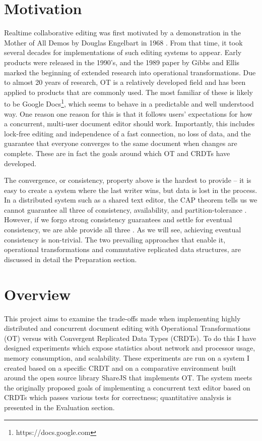\documentclass[12pt,a4paper,twoside,openright]{report}
\begin{document}
\section{Motivation}

Realtime collaborative editing was first motivated by a demonstration in the Mother of All Demos by Douglas Engelbart in 1968 \cite{MotherDemo}. From that time, it took several decades for implementations of such editing systems to appear. Early products were released in the 1990's, and the 1989 paper by Gibbs and Ellis \cite{Ellis1989} marked the beginning of extended research into operational transformations. Due to almost 20 years of research, OT is a relatively developed field and has been applied to products that are commonly used. The most familiar of these is likely to be Google Docs\footnote{https://docs.google.com}, which seems to behave in a predictable and well understood way. One reason one reason for this is that it follows users' expectations for how a concurrent, multi-user document editor should work. Importantly, this includes lock-free editing and independence of a fast connection, no loss of data, and the guarantee that everyone converges to the same document when changes are complete. These are in fact the goals around which OT and CRDTs have developed.

The convergence, or consistency, property above is the hardest to provide -- it is easy to create a system where the last writer wins, but data is lost in the process. In a distributed system such as a shared text editor, the CAP theorem tells us we cannot guarantee all three of consistency, availability, and partition-tolerance \cite{Gilbert2005}. However, if we forgo strong consistency guarantees and settle for eventual consistency, we are able provide all three \cite{zeller2014}. As we will see, achieving eventual consistency is non-trivial. The two prevailing approaches that enable it, operational transformations and commutative replicated data structures, are discussed in detail the Preparation section.


\section{Overview}
This project aims to examine the trade-offs made when implementing highly distributed and concurrent document editing with Operational Transformations (OT) versus with Convergent Replicated Data Types (CRDTs). To do this I have designed experiments which expose statistics about network and processor usage, memory consumption, and scalability. These experiments are run on a system I created based on a specific CRDT and on a comparative environment built around the open source library ShareJS that implements OT. The system meets the originally proposed goals of implementing a concurrent text editor based on CRDTs which passes various tests for correctness; quantitative analysis is presented in the Evaluation section.
\end{document}
